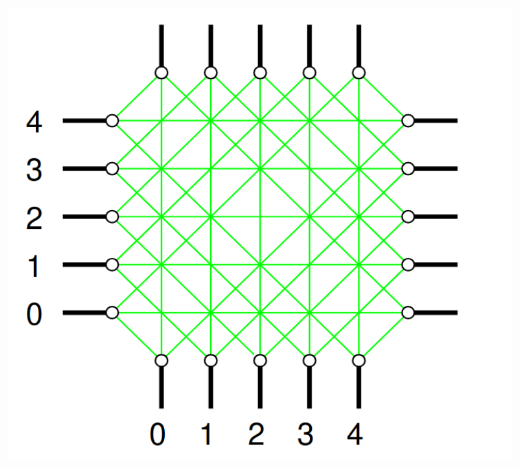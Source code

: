 \begin{qsolve}
	\begin{center}
		\includegraphics*[width=0.4\linewidth]{pics/Q9.png}
		\label{معماری سوئیچ یونیورسال}
	\end{center}
	
\end{qsolve}
